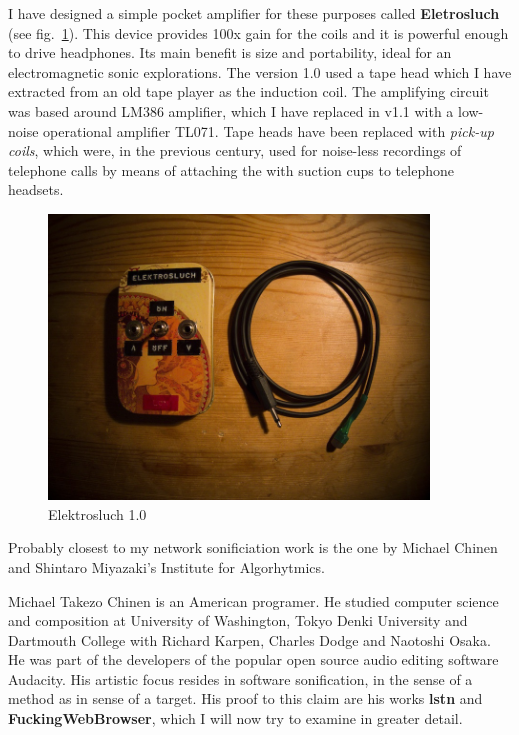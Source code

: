 \documentclass[12pt,a4paper,oneside]{report}
\begin{document}
I have designed a simple pocket amplifier for these purposes called \textbf{Eletrosluch} (see fig.~\ref{fig:elektrosluch}). This device provides 100x gain for the coils and it is powerful enough to drive headphones. Its main benefit is size and portability, ideal for an electromagnetic sonic explorations. The version 1.0 used a tape head which I have extracted from an old tape player as the induction coil. The amplifying circuit was based around LM386 amplifier, which I have replaced in v1.1 with a low-noise operational amplifier TL071. Tape heads have been replaced with \emph{pick-up coils}, which were, in the previous century, used for noise-less recordings of telephone calls by means of attaching the with suction cups to telephone headsets. 

\begin{figure}  
  \centering
    \includegraphics[width=0.9\textwidth]{img/elektrosluch}
	\caption{Elektrosluch 1.0}
	\label{fig:elektrosluch}
\end{figure}

Probably closest to my network sonificiation work is the one by Michael Chinen  and Shintaro Miyazaki's Institute for Algorhytmics. 

Michael Takezo Chinen is an American programer. He studied computer science and composition at University of Washington, Tokyo Denki University and Dartmouth College with Richard Karpen, Charles Dodge and Naotoshi Osaka. He was part of the developers of the popular open source audio editing software Audacity. His artistic focus resides in software sonification, in the sense of a method as in sense of a target. His proof to this claim are his works \textbf{lstn} and \textbf{FuckingWebBrowser}, which I will now try to examine in greater detail.~\cite{mchinen}
\end{document}
